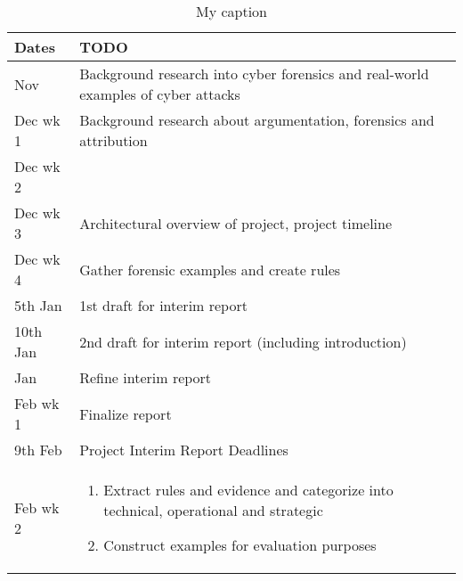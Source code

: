 \begin{table}[]
\centering
\caption{My caption}
\label{my-label}
\begin{tabular}{lll}
\hline
\multicolumn{1}{|l|}{Dates} & TODO                                                                              &  \\ \hline
Nov                         & Background research into cyber forensics and real-world examples of cyber attacks &  \\
Dec wk 1                    & Background research about argumentation, forensics and attribution                &  \\
Dec wk 2                    &                                                                                   &  \\ \hline
Dec wk 3                    &  Architectural overview of project, project timeline 								&  \\
Dec wk 4                    &	Gather forensic examples and create rules	&  \\
5th Jan                     &	1st draft for interim report	&  \\
10th Jan                    &	2nd draft for interim report (including introduction)	&  \\
Jan                         &	Refine interim report	&  \\
Feb wk 1                    &	Finalize report	&  \\
9th Feb                     &	Project Interim Report Deadlines	&  \\
Feb wk 2                    & 
\begin{enumerate}
   \item Extract rules and evidence and categorize into technical, operational and strategic
   \item Construct examples for evaluation purposes
   

\end{enumerate}
\end{tabular}
\end{table}

